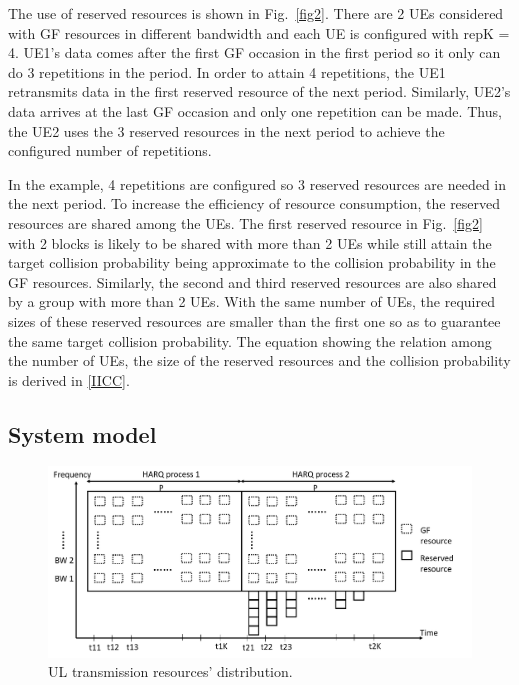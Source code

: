 \documentclass[conference]{IEEEtran}
\begin{document}
The use of reserved resources is shown in Fig.~\ref{fig2}. There are 2 UEs considered with GF resources in different bandwidth and each UE is configured with repK = 4. UE1's data comes after the first GF occasion in the first period so it only can do 3 repetitions in the period. In order to attain 4 repetitions, the UE1 retransmits data in the first reserved resource of the next period. Similarly, UE2's data arrives at the last GF occasion and only one repetition can be made. Thus, the UE2 uses the 3 reserved resources in the next period to achieve the configured number of repetitions.

In the example, 4 repetitions are configured so 3 reserved resources are needed in the next period. To increase the efficiency of resource consumption, the reserved resources are shared among the UEs. The first reserved resource in Fig.~\ref{fig2} with 2 blocks is likely to be shared with more than 2 UEs while still attain the target collision probability being approximate to the collision probability in the GF resources. Similarly, the second and third reserved resources are also shared by a group with more than 2 UEs. With the same number of UEs, the required sizes of these reserved resources are smaller than the first one so as to guarantee the same target collision probability. The equation showing the relation among the number of UEs, the size of the reserved resources and the collision probability is derived in \ref{IICC}.

\subsection{System model}\label{IIBB}

\begin{figure}[htbp]
\centerline{\includegraphics[scale=0.25]{fig3.png}}
\caption{UL transmission resources' distribution.}
\label{fig3}
\end{figure}
\end{document}
